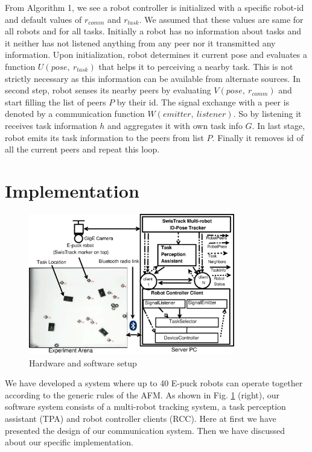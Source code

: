 \documentclass[letterpaper, 10 pt, conference]{ieeeconf}  %
\begin{document}
From Algorithm 1, we see a robot controller is initialized with a specific robot-id and default values of $r_{comm}$ and $r_{task}$. We assumed that these values are same for all robots and for all tasks.
Initially a robot has no information about tasks and it neither has not listened anything from any peer nor it transmitted any information. Upon initialization, robot determines it current pose and evaluates a function  $U(pose,~ r_{task})$ that helps it to perceiving a nearby task. This is not strictly necessary as this information can be available from alternate sources. In second step, robot senses its nearby peers by evaluating $V(pose,~ r_{comm})$ and start filling the list of peers $P$ by their id. The  signal exchange with a peer is denoted by  a communication function  $W(emitter,~listener)$. So by listening it receives task information $h$ and aggregates it with own task info $G$.  In last stage, robot emits its task information to the peers from list $P$. Finally it removes id of all the current peers and repeat this loop. 
%
\section{Implementation}
\label{sec:impl}
\begin{figure}
\centering
\includegraphics[width=9cm, angle=0]
{../dia-files/RIL-Expt-Setup2.eps}
\caption{\small Hardware and software setup}
\label{fig:setup} %
\end{figure}
We have developed a system where up to 40 E-puck robots \cite{Epuck} can operate together according to the generic rules of the AFM. As shown in Fig. \ref{fig:setup} (right), our software system consists of a multi-robot tracking system, a task perception assistant (TPA) and robot controller clients (RCC). Here at first we have presented the design of our communication system. Then we have discussed about our specific implementation. 
\end{document}

